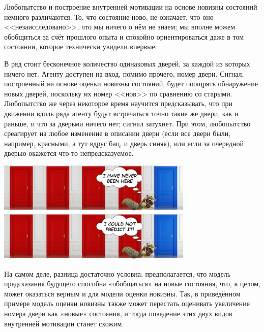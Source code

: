 Любопытство и построение внутренней мотивации на основе новизны состояний немного различаются. То, что состояние ново, не означает, что оно <<незаисследовано>>, что мы ничего о нём не знаем; мы вполне можем обобщиться за счёт прошлого опыта и спокойно ориентироваться даже в том состоянии, которое технически увидели впервые.

\begin{example}
В ряд стоит бесконечное количество одинаковых дверей, за каждой из которых ничего нет. Агенту доступен на вход, помимо прочего, номер двери. Сигнал, построенный на основе оценки новизны состояний, будет поощрять обнаружение новых дверей, поскольку
их номер <<нов>> по сравнению со старыми. Любопытство же через некоторое время научится предсказывать, что при движении вдоль ряда агенту будут встречаться точно такие же двери, как и раньше, и что за дверьми ничего нет; сигнал затухнет. При этом, любопытство среагирует на любое изменение в описании двери (если все двери были, например, красными, а тут вдруг бац, и дверь синяя), или если за очередной дверью окажется что-то непредсказуемое.

\begin{center}
\vspace{0.2cm}
    \includegraphics[width=0.7\textwidth]{Images/noveltydoors.png}
    \includegraphics[width=0.7\textwidth]{Images/curiositydoors.png}
\vspace{-0.2cm}
\end{center}

На самом деле, разница достаточно условна: предполагается, что модель предсказания будущего способна «обобщаться» на новые состояния, что, в целом, может оказаться верным и для модели оценки новизны. Так, в приведённом примере модель оценки новизны также может перестать оценивать увеличение номера двери как «новые» состояния, и тогда поведение этих двух видов внутренней мотивации станет схожим.

\end{example}

